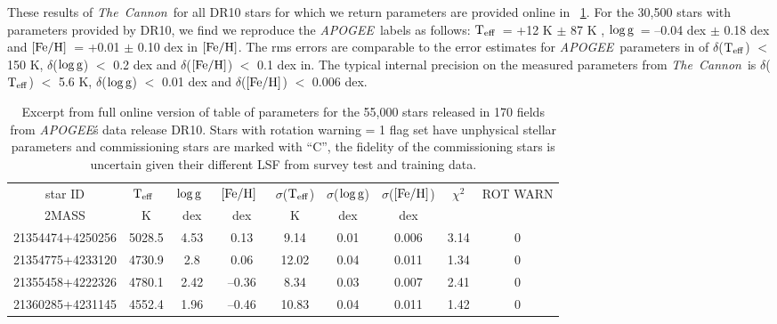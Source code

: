 \documentclass[12pt, preprint]{aastex}
\newcommand{\tc}{\textsl{The~Cannon}}
\newcommand{\apogee}{\textsl{APOGEE}}
\newcommand{\teff}{\mbox{$\rm T_{eff}$}}
\newcommand{\feh}{\mbox{$\rm [Fe/H]$}}
\newcommand{\logg}{\mbox{$\rm \log g$}}
\begin{document}
These results of \tc\ for all DR10 stars for which we return parameters are provided online in \tablename~\ref{tab:online}. 
For the 30,500 stars with parameters provided by DR10, we find we reproduce the \apogee\ labels as follows: 
\teff\ = +12 K $\pm$ 87 K , \logg\ = --0.04 dex $\pm$ 0.18 dex and \feh\ = +0.01 $\pm$ 0.10 dex in \feh. 
The rms errors are comparable to the error estimates for \apogee\ parameters in \citet{Meszaros2013} 
of $\delta$(\teff) $<$ 150 K, $\delta$(\logg) $<$ 0.2 dex and $\delta$(\feh) $<$ 0.1 dex in. 
The typical internal precision on the measured parameters from \tc\ is $\delta$(\teff) $<$ 5.6 K, $\delta$(\logg) $<$ 0.01 dex and $\delta$(\feh) $<$ 0.006 dex.

\begin{table}[!h]
\small{
\centering
\caption{Excerpt from full online version of table of parameters for the 55,000 stars released in 170 fields from \apogee\'s data release DR10. Stars with rotation warning = 1 flag set have unphysical stellar parameters and commissioning stars are marked with ``C'', the fidelity of the commissioning stars is uncertain given their different LSF from survey test and training data.} \begin{tabular}{| c | c | c |  c | c | c |  c | c | c |} %
\hline
star ID & \teff\ & \logg\ & \feh\ & $\sigma$(\teff) & $\sigma$(\logg) & $\sigma$(\feh) & $\chi^2$ & \tiny{ROT WARN}\\
{2MASS} &  K &  dex  & dex & K & dex & dex & & \\    
\hline
21354474+4250256 & 5028.5 & 4.53 & 0.13 & 9.14 & 0.01 & 0.006 & 3.14 & 0\\
21354775+4233120 & 4730.9 & 2.8 & 0.06 & 12.02 & 0.04 & 0.011 & 1.34 & 0\\
21355458+4222326 & 4780.1 & 2.42 & --0.36 & 8.34 & 0.03 & 0.007 & 2.41 & 0\\
21360285+4231145 &  4552.4 &  1.96 & --0.46  & 10.83 & 0.04 & 0.011 &  1.42 &  0\\
 \hline
\end{tabular}
\label{tab:online} }
\end{table}  
 
\end{document}
